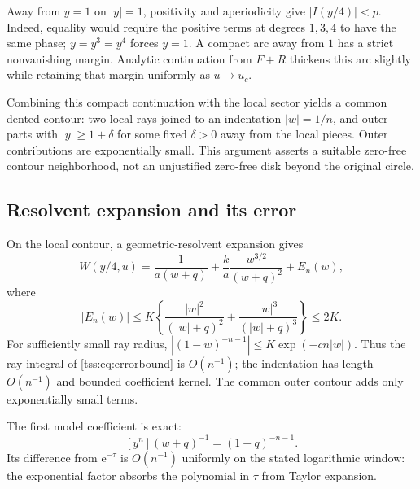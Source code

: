 \documentclass[11pt]{article}
\theoremstyle{remark}\newtheorem{remark}[theorem]{Remark}
\theoremstyle{definition}\newtheorem{definition}[theorem]{Definition}
\newcommand{\e}{\mathrm e}
\begin{document}
Away from $y=1$ on $|y|=1$, positivity and aperiodicity give
$|I(y/4)|<p$. Indeed, equality would require the positive terms at degrees $1,3,4$ to have the same phase; $y=y^3=y^4$ forces $y=1$. A compact arc away from $1$ has a strict nonvanishing margin. Analytic continuation from $F+R$ thickens this arc slightly while retaining that margin uniformly as $u\to u_c$.

Combining this compact continuation with the local sector yields a common dented contour: two local rays joined to an indentation $|w|=1/n$, and outer parts with $|y|\geq1+\delta$ for some fixed $\delta>0$ away from the local pieces. Outer contributions are exponentially small. This argument asserts a suitable zero-free contour neighborhood, not an unjustified zero-free disk beyond the original circle.

\subsection{Resolvent expansion and its error}
On the local contour, a geometric-resolvent expansion gives
\begin{equation}\label{tss:eq:resolve}
W(y/4,u)=\frac1{a(w+q)}+\frac{k}{a}\frac{w^{3/2}}{(w+q)^2}+E_n(w),
\end{equation}
where
\begin{equation}\label{tss:eq:errorbound}
|E_n(w)|\leq K\left\{\frac{|w|^2}{(|w|+q)^2}
                  +\frac{|w|^3}{(|w|+q)^3}\right\}\leq2K.
\end{equation}
For sufficiently small ray radius,
$|(1-w)^{-n-1}|\leq K\exp(-cn|w|)$.
Thus the ray integral of \eqref{tss:eq:errorbound} is $O(n^{-1})$; the indentation has length $O(n^{-1})$ and bounded coefficient kernel. The common outer contour adds only exponentially small terms.

The first model coefficient is exact:
\begin{equation}\label{tss:eq:carrier}
[y^n](w+q)^{-1}=(1+q)^{-n-1}.
\end{equation}
Its difference from $\e^{-\tau}$ is $O(n^{-1})$ uniformly on the stated logarithmic window: the exponential factor absorbs the polynomial in $\tau$ from Taylor expansion.
\end{document}
